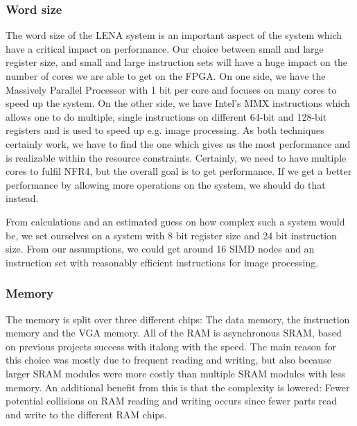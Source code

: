 \subsubsection{Word size}

The word size of the \ac{LENA} system is an important aspect of the system which
have a critical impact on performance. Our choice between small and large
register size, and
small and large instruction sets will have a huge impact on the number of cores
we are able to get on the \ac{FPGA}. On one side, we have the Massively Parallel
Processor\cite{potter1985mpp} with 1 bit per core and focuses on many cores to
speed up the system. On the other side, we have Intel's MMX instructions which
allows one to do multiple, single instructions on different 64-bit and 128-bit
registers and is used to speed up e.g. image processing\cite{lee2004h264}. As
both techniques certainly work, we have to find the one which gives us the most
performance and is realizable within the resource constraints. Certainly, we
need to have multiple cores to fulfil NFR4, but the overall goal is to get
performance. If we get a better performance by allowing more operations on the
system, we should do that instead.

From calculations and an estimated guess
on how complex such a system would be, we set ourselves on a system with 8 bit register size and 24 bit instruction
size. From our assumptions, we could get around 16 \ac{SIMD} nodes and an
instruction set with reasonably efficient instructions for image processing.

\subsubsection{Memory}

The memory is split over three different chips: The data memory, the instruction
memory and the \ac{VGA} memory. All of the \ac{RAM} is asynchronous \ac{SRAM},
based on previous projects success with it\cite{berg2011festinalente}along with
the speed. The main reason for this choice was mostly due to frequent reading
and writing, but also because larger \ac{SRAM} modules were more costly than
multiple \ac{SRAM} modules with less memory. An additional benefit from this is
that the complexity is lowered: Fewer potential collisions on \ac{RAM} reading
and writing occurs since fewer parts read and write to the different \ac{RAM}
chips.

